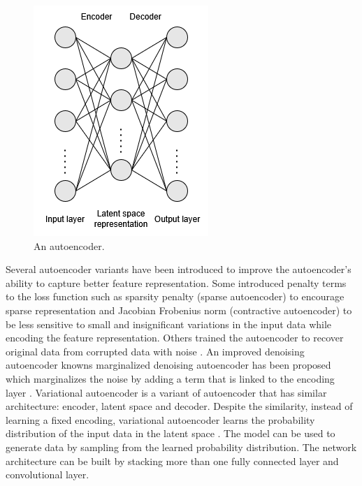 \documentclass[preprint,12pt]{elsarticle}
\begin{document}
\begin{figure}[h!]
    \centering
    \includegraphics[scale=0.6]{fig_deep_unsv_learning_ae.png}
    \caption{An autoencoder.}
    \label{fig_deep_unsv_learning_ae}
\end{figure}

Several autoencoder variants have been introduced to improve the autoencoder’s ability to capture better feature representation. Some introduced penalty terms to the loss function such as sparsity penalty (sparse autoencoder) \citep{ng_sparse_2011} to encourage sparse representation and Jacobian Frobenius norm (contractive autoencoder) \citep{rifai_higher_2011} to be less sensitive to small and insignificant variations in the input data while encoding the feature representation. Others trained the autoencoder to recover original data from corrupted data with noise \citep{vincent_extracting_2008}. An improved denoising autoencoder knowns marginalized denoising autoencoder has been proposed which marginalizes the noise by adding a term that is linked to the encoding layer \citep{chen_marginalized_2012}. Variational autoencoder is a variant of autoencoder that has similar architecture: encoder, latent space and decoder. Despite the similarity, instead of learning a fixed encoding, variational autoencoder learns the probability distribution of the input data in the latent space \citep{kingma_auto-encoding_2013}. The model can be used to generate data by sampling from the learned probability distribution. The network architecture can be built by stacking more than one fully connected layer and convolutional layer.
\end{document}
